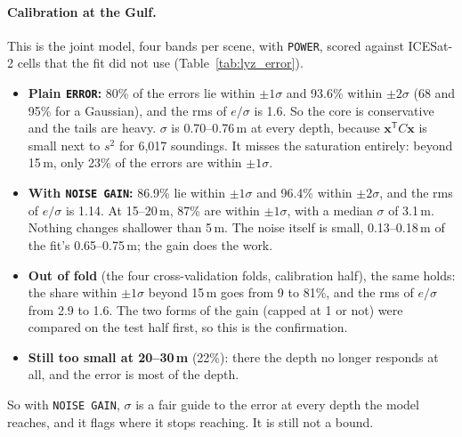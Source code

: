 \documentclass[11pt]{article}
\numberwithin{equation}{section}
\newcommand{\code}[1]{\texttt{#1}}
\begin{document}
\paragraph{Calibration at the Gulf.} This is the joint model, four bands per scene, with
\code{POWER}, scored against ICESat-2 cells that the fit did not use (Table~\ref{tab:lyz_error}).
\begin{itemize}
\item \textbf{Plain \code{ERROR}:} 80\% of the errors lie within $\pm1\sigma$ and 93.6\% within
  $\pm2\sigma$ (68 and 95\% for a Gaussian), and the rms of $e/\sigma$ is 1.6. So the core is
  conservative and the tails are heavy. $\sigma$ is 0.70--0.76\,m at every depth, because
  $\mathbf{x}^{\mathsf T}C\mathbf{x}$ is small next to $s^2$ for 6,017 soundings. It misses the
  saturation entirely: beyond 15\,m, only 23\% of the errors are within $\pm1\sigma$.
\item \textbf{With \code{NOISE GAIN}:} 86.9\% lie within $\pm1\sigma$ and 96.4\% within
  $\pm2\sigma$, and the rms of $e/\sigma$ is 1.14. At 15--20\,m, 87\% are within $\pm1\sigma$, with a
  median $\sigma$ of 3.1\,m. Nothing changes shallower than 5\,m. The noise itself is small,
  0.13--0.18\,m of the fit's 0.65--0.75\,m; the gain does the work.
\item \textbf{Out of fold} (the four cross-validation folds, calibration half), the same holds: the
  share within $\pm1\sigma$ beyond 15\,m goes from 9 to 81\%, and the rms of $e/\sigma$ from 2.9 to
  1.6. The two forms of the gain (capped at 1 or not) were compared on the test half first, so this
  is the confirmation.
\item \textbf{Still too small at 20--30\,m} (22\%): there the depth no longer responds at all, and
  the error is most of the depth.
\end{itemize}
So with \code{NOISE GAIN}, $\sigma$ is a fair guide to the error at every depth the model reaches,
and it flags where it stops reaching. It is still not a bound.
\end{document}
